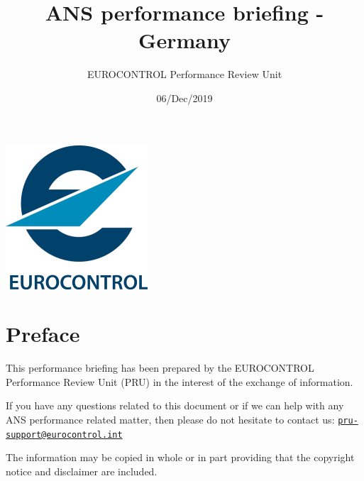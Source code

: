 \documentclass[
]{article}
\title{ANS performance briefing - Germany}
\author{EUROCONTROL Performance Review Unit}
\date{06/Dec/2019}
\begin{document}
\maketitle

\begin{center}\includegraphics[width=\textwidth]{images/logo} \end{center}

\newpage

\hypertarget{preface}{%
\section*{Preface}\label{preface}}

This performance briefing has been prepared by the EUROCONTROL Performance Review Unit (PRU) in the interest of the exchange of information.

If you have any questions related to this document or if we can help with any ANS performance related matter, then please do not hesitate to contact us: \href{mailto:pru-support@eurocontrol.int}{\nolinkurl{pru-support@eurocontrol.int}}

The information may be copied in whole or in part providing that the copyright notice and disclaimer are included.
\end{document}
